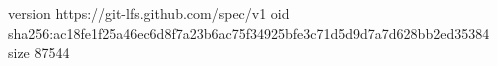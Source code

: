 version https://git-lfs.github.com/spec/v1
oid sha256:ac18fe1f25a46ec6d8f7a23b6ac75f34925bfe3c71d5d9d7a7d628bb2ed35384
size 87544

